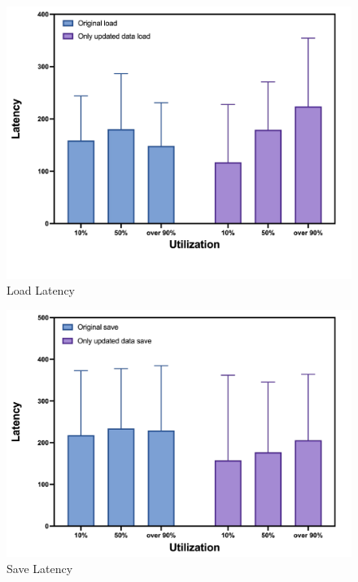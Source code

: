 \begin{figure}[t]
    \centering
	\includegraphics[width=0.95\columnwidth]{graphs/load_latency}
	\caption{Load Latency}
	\label{f:load_latency}
\end{figure}

\begin{figure}[t]
    \centering
	\includegraphics[width=0.95\columnwidth]{graphs/save_latency}
	\caption{Save Latency}
	\label{f:save_latency}
\end{figure}
